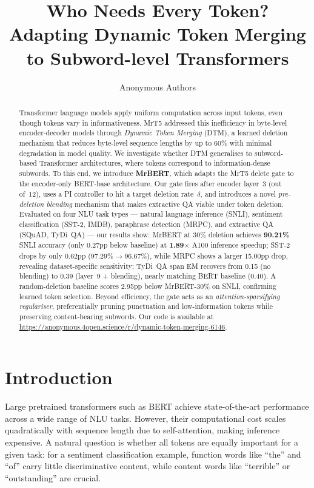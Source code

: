 \documentclass{article} %
\title{\centering Who Needs Every Token? \\ Adapting Dynamic Token Merging to Subword-level Transformers}
\author{Anonymous Authors}
\begin{document}
\ifcolmsubmission
\linenumbers
\fi

\maketitle

\begin{abstract}
Transformer language models apply uniform computation across input tokens, even though tokens vary in informativeness.
MrT5 \citep{kallini2024mrt5} addressed this inefficiency in byte-level encoder-decoder models through \emph{Dynamic Token Merging} (DTM), a learned deletion mechanism that reduces byte-level sequence lengths by up to 60\% with minimal degradation in model quality.
We investigate whether DTM generalises to subword-based Transformer architectures, where tokens correspond to information-dense subwords. To this end, we introduce \textbf{MrBERT}, which adapts the MrT5 delete gate to the encoder-only BERT-base architecture.
Our gate fires after encoder layer~3 (out of~12), uses a PI controller to hit a target deletion rate~$\delta$, and introduces a novel \emph{pre-deletion blending} mechanism that makes extractive QA viable under token deletion.
Evaluated on four NLU task types --- natural language inference (SNLI), sentiment classification (SST-2, IMDB), paraphrase detection (MRPC), and extractive QA (SQuAD, TyDi~QA) --- our results show:
MrBERT at 30\% deletion achieves \textbf{90.21\%} SNLI accuracy (only 0.27pp below baseline) at \textbf{1.89$\times$} A100 inference speedup;
SST-2 drops by only 0.62pp (97.29\%$\to$96.67\%), while MRPC shows a larger 15.00pp drop, revealing dataset-specific sensitivity;
TyDi~QA span EM recovers from 0.15 (no blending) to 0.39 (layer~9 + blending), nearly matching BERT baseline (0.40).
A random-deletion baseline scores 2.95pp below MrBERT-30\% on SNLI, confirming learned token selection.
Beyond efficiency, the gate acts as an \emph{attention-sparsifying regulariser}, preferentially pruning punctuation and low-information tokens while preserving content-bearing subwords.
Our code is available at \url{https://anonymous.4open.science/r/dynamic-token-merging-6146}.
\end{abstract}


\section{Introduction}
\label{sec:introduction}

Large pretrained transformers such as BERT \citep{devlin2019bert} achieve state-of-the-art performance across a wide range of NLU tasks. However, their computational cost scales quadratically with sequence length due to self-attention, making inference expensive. A natural question is whether all tokens are equally important for a given task: for a sentiment classification example, function words like ``the'' and ``of'' carry little discriminative content, while content words like ``terrible'' or ``outstanding'' are crucial.
\end{document}
